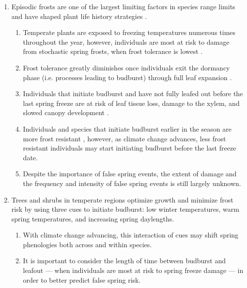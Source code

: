 \documentclass{article}\usepackage[]{graphicx}\usepackage[]{color}
\begin{document}
\begin{enumerate}
\item Episodic frosts are one of the largest limiting factors in species range limits and have shaped plant life history strategies \citep{Kollas2014}. 
\begin{enumerate}
\item Temperate plants are exposed to freezing temperatures numerous times throughout the year, however, individuals are most at risk to damage from stochastic spring frosts, when frost tolerance is lowest \citep{Sakai1987}. 
\item Frost tolerance greatly diminishes once individuals exit the dormancy phase (i.e. processes leading to budburst) through full leaf expansion \citep{Vitasse2014, Lenz2016}. %
\item Individuals that initiate budburst and have not fully leafed out before the last spring freeze are at risk of leaf tissue loss, damage to the xylem, and slowed canopy development \citep{Gu2008, Hufkens2012}.
\item Individuals and species that initiate budburst earlier in the season are more frost resistant \citep{Korner2016}, however, as climate change advances, less frost resistant individuals may start initiating budburst before the last freeze date.
\item Despite the importance of false spring events, the extent of damage and the frequency and intensity of false spring events is still largely unknown.
\end{enumerate}

\item Trees and shrubs in temperate regions optimize growth and minimize frost risk by using three cues to initiate budburst: low winter temperatures, warm spring temperatures, and increasing spring daylengths.
\begin{enumerate}
 \item With climate change advancing, this interaction of cues may shift spring phenologies both across and within species.
 \item It is important to consider the length of time between budburst and leafout --- when individuals are most at risk to spring freeze damage \citep{Lenz2016} --- in order to better predict false spring risk.
\end{enumerate}


\end{enumerate}
\end{document}
